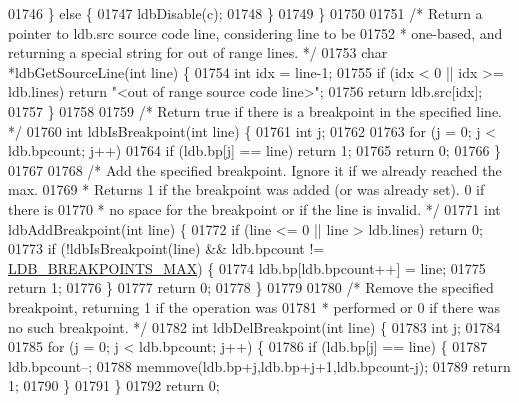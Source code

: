 \begin{DoxyCode}
{{{{{{{{{{{{{{01746     \} \textcolor{keywordflow}{else} \{
01747         ldbDisable(c);
01748     \}
01749 \}
01750 
01751 \textcolor{comment}{/* Return a pointer to ldb.src source code line, considering line to be}
01752 \textcolor{comment}{ * one-based, and returning a special string for out of range lines. */}
01753 \textcolor{keywordtype}{char} *ldbGetSourceLine(\textcolor{keywordtype}{int} line) \{
01754     \textcolor{keywordtype}{int} idx = line-1;
01755     \textcolor{keywordflow}{if} (idx < 0 || idx >= ldb.lines) \textcolor{keywordflow}{return} \textcolor{stringliteral}{"<out of range source code line>"};
01756     \textcolor{keywordflow}{return} ldb.src[idx];
01757 \}
01758 
01759 \textcolor{comment}{/* Return true if there is a breakpoint in the specified line. */}
01760 \textcolor{keywordtype}{int} ldbIsBreakpoint(\textcolor{keywordtype}{int} line) \{
01761     \textcolor{keywordtype}{int} j;
01762 
01763     \textcolor{keywordflow}{for} (j = 0; j < ldb.bpcount; j++)
01764         \textcolor{keywordflow}{if} (ldb.bp[j] == line) \textcolor{keywordflow}{return} 1;
01765     \textcolor{keywordflow}{return} 0;
01766 \}
01767 
01768 \textcolor{comment}{/* Add the specified breakpoint. Ignore it if we already reached the max.}
01769 \textcolor{comment}{ * Returns 1 if the breakpoint was added (or was already set). 0 if there is}
01770 \textcolor{comment}{ * no space for the breakpoint or if the line is invalid. */}
01771 \textcolor{keywordtype}{int} ldbAddBreakpoint(\textcolor{keywordtype}{int} line) \{
01772     \textcolor{keywordflow}{if} (line <= 0 || line > ldb.lines) \textcolor{keywordflow}{return} 0;
01773     \textcolor{keywordflow}{if} (!ldbIsBreakpoint(line) && ldb.bpcount != \hyperlink{scripting_8c_a4f3000cf3b5955f8134bfcd2fa340db3}{LDB\_BREAKPOINTS\_MAX}) \{
01774         ldb.bp[ldb.bpcount++] = line;
01775         \textcolor{keywordflow}{return} 1;
01776     \}
01777     \textcolor{keywordflow}{return} 0;
01778 \}
01779 
01780 \textcolor{comment}{/* Remove the specified breakpoint, returning 1 if the operation was}
01781 \textcolor{comment}{ * performed or 0 if there was no such breakpoint. */}
01782 \textcolor{keywordtype}{int} ldbDelBreakpoint(\textcolor{keywordtype}{int} line) \{
01783     \textcolor{keywordtype}{int} j;
01784 
01785     \textcolor{keywordflow}{for} (j = 0; j < ldb.bpcount; j++) \{
01786         \textcolor{keywordflow}{if} (ldb.bp[j] == line) \{
01787             ldb.bpcount--;
01788             memmove(ldb.bp+j,ldb.bp+j+1,ldb.bpcount-j);
01789             \textcolor{keywordflow}{return} 1;
01790         \}
01791     \}
01792     \textcolor{keywordflow}{return} 0;
}}}}}}}}}}}}}}
\end{DoxyCode}
